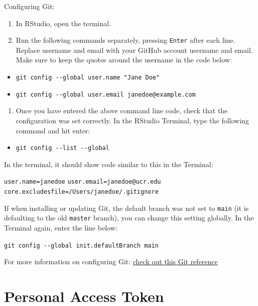 \documentclass[
]{book}
\providecommand{\tightlist}{%
  \setlength{\itemsep}{0pt}\setlength{\parskip}{0pt}}
\begin{document}
Configuring Git:

\begin{enumerate}
\def\labelenumi{\arabic{enumi}.}
\tightlist
\item
  In RStudio, open the terminal.
\item
  Run the following commands separately, pressing \texttt{Enter} after each line. Replace username and email with your GitHub account username and email. Make sure to keep the quotes around the username in the code below:
\end{enumerate}

\begin{itemize}
\tightlist
\item
  \texttt{git\ config\ -\/-global\ user.name\ "Jane\ Doe"}
\item
  \texttt{git\ config\ -\/-global\ user.email\ janedoe@example.com}
\end{itemize}

\begin{enumerate}
\def\labelenumi{\arabic{enumi}.}
\setcounter{enumi}{2}
\tightlist
\item
  Once you have entered the above command line code, check that the configuration was set correctly. In the RStudio Terminal, type the following command and hit enter:
\end{enumerate}

\begin{itemize}
\tightlist
\item
  \texttt{git\ config\ -\/-list\ -\/-global}
\end{itemize}

In the terminal, it should show code similar to this in the Terminal:

\texttt{user.name=janedoe}
\texttt{user.email=janedoe@ucr.edu}
\texttt{core.excludesfile=/Users/janedoe/.gitignore}

If when installing or updating Git, the default branch was not set to \texttt{main} (it is defaulting to the old \texttt{master} branch), you can change this setting globally. In the Terminal again, enter the line below:

\texttt{git\ config\ -\/-global\ init.defaultBranch\ main}

For more information on configuring Git: \href{https://git-scm.com/book/en/v2/Getting-Started-First-Time-Git-Setup}{check out this Git reference}

\hypertarget{personal-access-token}{%
\section{Personal Access Token}\label{personal-access-token}}
\end{document}
